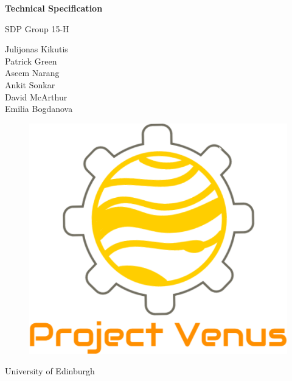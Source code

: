 \documentclass[a4paper,12pt]{article}
\begin{document}
\begin{titlepage}
    \begin{center}
        \vspace*{1cm}
        
        \Huge
        \textbf{Technical Specification}
        
        \vspace{0.5cm}
        \LARGE
        SDP Group 15-H
        
        \vspace{1.5cm}
        \normalsize
        Julijonas Kikutis\\ 
		Patrick Green\\
		Aseem Narang\\
		Ankit Sonkar\\
		David McArthur\\
		Emilia Bogdanova
        
        \vfill
        
        
        \vspace{0.8cm}
        
        \begin{figure}
    	\vspace*{-3em}
    	\centering
    	\includegraphics[scale=.30]{logo.png}
		\end{figure}
        
        \Large
        University of Edinburgh\\
        
    \end{center}
\end{titlepage}
\end{document}
